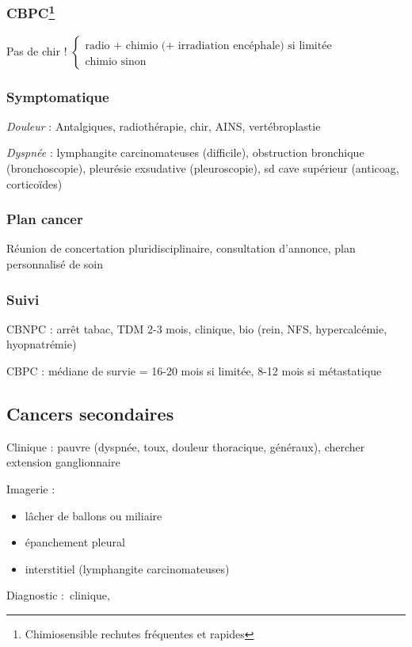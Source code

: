 \documentclass{book}
\begin{document}
\subsubsection{CBPC\footnote{Chimiosensible rechutes fréquentes et rapides}}
\label{sec:org4c0f53b}
Pas de chir !
$
\left \{
  \begin{array}{l}
    \text{radio + chimio (+ irradiation encéphale) si limitée}\\
    \text{chimio sinon}
  \end{array}
\right.
$
\subsubsection{Symptomatique}
\label{sec:org8be84f8}
\emph{Douleur}  : Antalgiques, radiothérapie, chir, AINS, vertébroplastie

\emph{Dyspnée}  : lymphangite carcinomateuses (difficile), obstruction bronchique
(bronchoscopie), pleurésie exsudative (pleuroscopie), sd cave supérieur
(anticoag, corticoïdes)

\subsubsection{Plan cancer}
\label{sec:org0487b6d}
Réunion de concertation pluridisciplinaire, consultation d'annonce, plan
personnalisé de soin
\subsubsection{Suivi}
\label{sec:org4d9cf9b}
CBNPC : arrêt tabac, TDM 2-3 mois, clinique, bio (rein, NFS, hypercalcémie,
hyopnatrémie)

CBPC : médiane de survie = 16-20 mois si limitée, 8-12 mois si métastatique
\subsection{Cancers secondaires}
\label{sec:orgf3607a1}
Clinique : pauvre (dyspnée, toux, douleur thoracique, généraux), chercher extension ganglionnaire

Imagerie : 

\begin{itemize}
\item lâcher de ballons ou miliaire
\item épanchement pleural
\item interstitiel (lymphangite carcinomateuses)
\end{itemize}


Diagnostic : clinique, 
\end{document}
